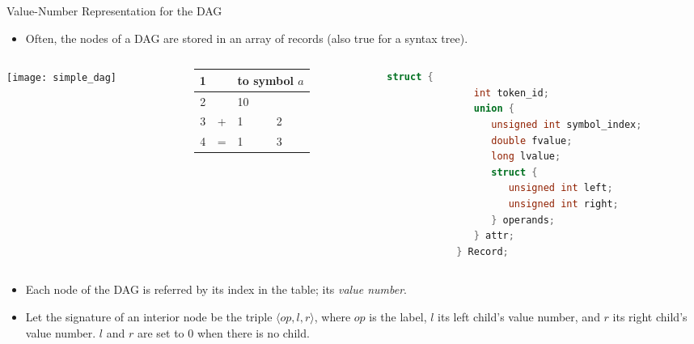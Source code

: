 \begin{bibunit}[apalike]
\begin{frame}[fragile]{Value-Number Representation for the DAG}
	\begin{footnotesize}
	\begin{itemize}
	\item Often, the nodes of a DAG are stored in an array of records (also true for a syntax tree).
	\end{itemize}
	\begin{columns}
		\begin{column}{.2\linewidth}
			\texttt{[image: simple\_dag]}
		\end{column}
		\begin{column}{.4\linewidth}
			\begin{scriptsize}
			\begin{tabularx}{\linewidth}{|c|X|X|X|}
				\hline
				1 & \tok{id} & \multicolumn{2}{l|}{to symbol $a$} \\
				\hline
				2 & \tok{num} & \multicolumn{2}{l|}{10} \\
				\hline
				3 & \tok+ & 1 & 2 \\
				\hline
				4 & \tok= & 1 & 3 \\
				\hline
			\end{tabularx}
			\end{scriptsize}
		\end{column}
		\begin{column}{.4\linewidth}
			\begin{scriptsize}
			\begin{lstlisting}[language=C]
			struct {
			   int token_id;
			   union {
			      unsigned int symbol_index;
			      double fvalue;
			      long lvalue;
			      struct {
			         unsigned int left;
			         unsigned int right;
			      } operands;
			   } attr;
			} Record;
			\end{lstlisting}
			\end{scriptsize}
		\end{column}
	\end{columns}
	\begin{itemize}
	\item Each node of the DAG is referred by its index in the table; its \emph{value number}.
	\item Let the signature of an interior node be the triple $\langle op,l,r \rangle$, where $op$ is the label, $l$ its left child's value number, and $r$ its right child's value number. $l$ and $r$ are set to $0$ when there is no child.
	\end{itemize}
	\end{footnotesize}
\end{frame}


\end{bibunit}
